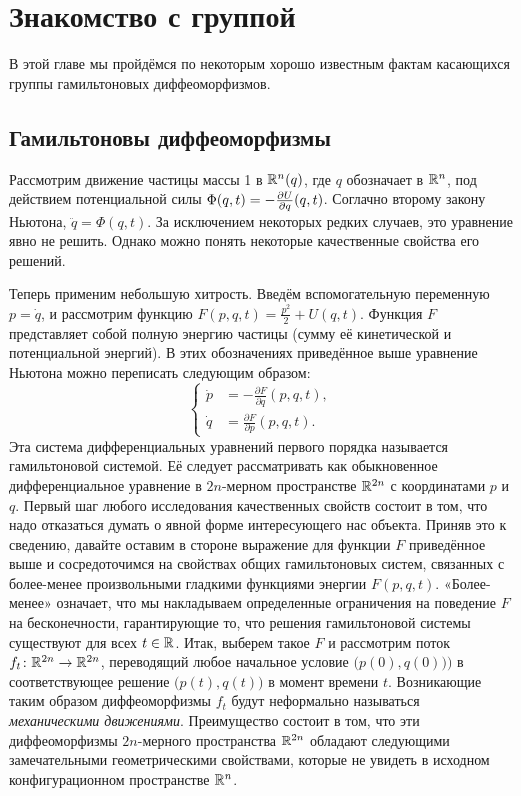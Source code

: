\chapter{Знакомство с группой}\label{chap:1}

В этой главе мы пройдёмся по некоторым хорошо известным фактам касающихся группы гамильтоновых диффеоморфизмов.

\section[Гамильтоновы диффеоморфизмы]{Гамильтоновы диффеоморфизмы}

Рассмотрим движение частицы массы 1 в $\mathbb{R}^n(q)$, где $q$ обозначает  в $\mathbb{R}^n$, под действием потенциальной силы $\Phi(q, t)  \z= - \tfrac{\partial U}{\partial q} (q, t)$.
Соглачно второму закону Ньютона, $\ddot q= \Phi (q, t)$.
За исключением некоторых редких случаев, это уравнение явно не решить.
Однако можно понять некоторые качественные свойства его решений.

Теперь применим небольшую хитрость.
Введём вспомогательную переменную $p = \dot q$, и рассмотрим функцию $F(p,q,t)= \tfrac {p^2} 2 + U (q, t)$.
Функция $F$ представляет собой полную энергию частицы (сумму её кинетической и потенциальной энергий).
В этих обозначениях приведённое выше уравнение Ньютона можно переписать следующим образом:
\[
\begin{cases}
\dot p &= - \tfrac{\partial F}{\partial q} (p, q, t),\\
\dot q &= \tfrac{\partial F}{\partial p} (p, q, t).
\end{cases}
\]
Эта система дифференциальных уравнений первого порядка называется гамильтоновой системой.
Её следует рассматривать как обыкновенное дифференциальное уравнение в $2n$-мерном пространстве $\mathbb{R}^{2n}$ с координатами $p$ и $q$.
Первый шаг любого исследования качественных свойств состоит в том, что надо отказаться думать о явной форме интересующего нас объекта.
Приняв это к сведению, давайте оставим в стороне выражение для функции
$F$ приведённое выше
и сосредоточимся на свойствах общих гамильтоновых систем, связанных с более-менее произвольными гладкими функциями энергии $F (p, q, t)$.
«Более-менее» означает, что мы накладываем определенные ограничения на поведение $F$ на бесконечности, гарантирующие то, что решения гамильтоновой системы существуют для всех $t\in \mathbb{R}$.
Итак, выберем такое $F$ и рассмотрим поток $f_t\colon \mathbb{R}^{2n} \to \mathbb{R}^{2n}$, переводящий любое начальное условие $\big(p(0),q(0)\big))$ в соответствующее решение $\big(p (t), q (t)\big)$ в момент времени $t$.
Возникающие таким образом диффеоморфизмы $f_t$ будут неформально называться \emph{механическими движениями}.
Преимущество  состоит в том, что эти диффеоморфизмы $2n$-мерного пространства $\mathbb{R}^{2n}$ обладают следующими замечательными геометрическими свойствами, которые не увидеть в исходном конфигурационном пространстве $\mathbb{R}^n$.

